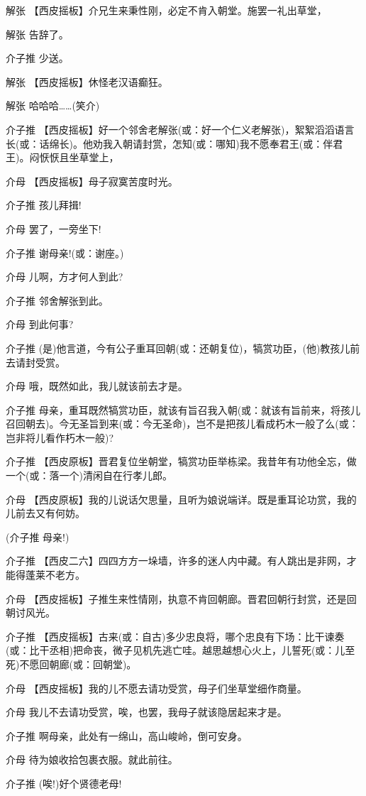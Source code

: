 解张 【西皮摇板】介兄生来秉性刚，必定不肯入朝堂。施罢一礼出草堂，

解张 告辞了。

介子推 少送。

解张 【西皮摇板】休怪老汉语癫狂。

解张 哈哈哈\ldots{}\ldots{}(笑介)

介子推
【西皮摇板】好一个邻舍老解张(或：好一个仁义老解张)，絮絮滔滔语言长(或：话绵长)。他劝我入朝请封赏，怎知(或：哪知)我不愿奉君王(或：伴君王)。闷恹恹且坐草堂上，

介母 【西皮摇板】母子寂寞苦度时光。

介子推 孩儿拜揖!

介母 罢了，一旁坐下!

介子推 谢母亲!(或：谢座。)

介母 儿啊，方才何人到此?

介子推 邻舍解张到此。

介母 到此何事?

介子推
(是)他言道，今有公子重耳回朝(或：还朝复位)，犒赏功臣，(他)教孩儿前去请封受赏。

介母 哦，既然如此，我儿就该前去才是。

介子推
母亲，重耳既然犒赏功臣，就该有旨召我入朝(或：就该有旨前来，将孩儿召回朝去)。今无圣旨到来(或：今无圣命)，岂不是把孩儿看成朽木一般了么(或：岂非将儿看作朽木一般)?

介子推
【西皮原板】晋君复位坐朝堂，犒赏功臣举栋梁。我昔年有功他全忘，做一个(或：落一个)清闲自在行孝儿郎。

介母
【西皮原板】我的儿说话欠思量，且听为娘说端详。既是重耳论功赏，我的儿前去又有何妨。

(介子推 母亲!)

介子推
【西皮二六】四四方方一垛墙，许多的迷人内中藏。有人跳出是非网，才能得蓬莱不老方。

介母
【西皮摇板】子推生来性情刚，执意不肯回朝廊。晋君回朝行封赏，还是回朝讨风光。

介子推
【西皮摇板】古来(或：自古)多少忠良将，哪个忠良有下场：比干谏奏(或：比干丞相)把命丧，微子见机先逃亡哇。越思越想心火上，儿誓死(或：儿至死)不愿回朝廊(或：回朝堂)。

介母 【西皮摇板】我的儿不愿去请功受赏，母子们坐草堂细作商量。

介母 我儿不去请功受赏，唉，也罢，我母子就该隐居起来才是。

介子推 啊母亲，此处有一绵山，高山峻岭，倒可安身。

介母 待为娘收拾包裹衣服。就此前往。

介子推 (唉!)好个贤德老母!

